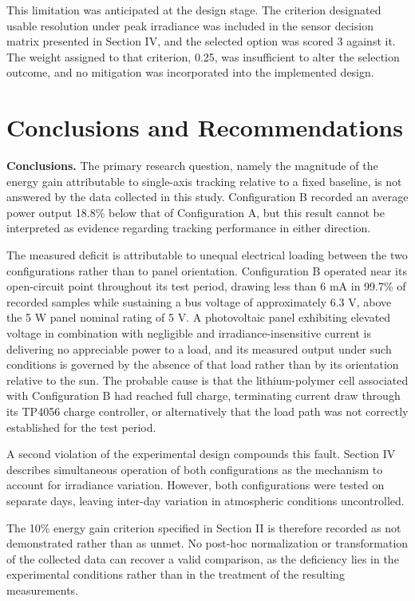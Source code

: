 \documentclass[journal]{IEEEtran}
\begin{document}
This limitation was anticipated at the design stage. The criterion designated usable
resolution under peak irradiance was included in the sensor decision matrix presented
in Section IV, and the selected option was scored 3 against it. The weight assigned to
that criterion, 0.25, was insufficient to alter the selection outcome, and no
mitigation was incorporated into the implemented design.

\section{Conclusions and Recommendations}

\textbf{Conclusions.} The primary research question, namely the magnitude of the
energy gain attributable to single-axis tracking relative to a fixed baseline, is not
answered by the data collected in this study. Configuration B recorded an average
power output 18.8\% below that of Configuration A, but this result cannot be
interpreted as evidence regarding tracking performance in either direction.

The measured deficit is attributable to unequal electrical loading between the two
configurations rather than to panel orientation. Configuration B operated near its
open-circuit point throughout its test period, drawing less than 6 mA in 99.7\% of
recorded samples while sustaining a bus voltage of approximately 6.3 V, above the 5 W
panel nominal rating of 5 V. A photovoltaic panel exhibiting elevated voltage in
combination with negligible and irradiance-insensitive current is delivering no
appreciable power to a load, and its measured output under such conditions is governed
by the absence of that load rather than by its orientation relative to the sun. The
probable cause is that the lithium-polymer cell associated with Configuration B had
reached full charge, terminating current draw through its TP4056 charge controller, or
alternatively that the load path was not correctly established for the test period.

A second violation of the experimental design compounds this fault. Section IV
describes simultaneous operation of both configurations as the mechanism to account for
irradiance variation. However, both configurations were tested on separate days,
leaving inter-day variation in atmospheric conditions uncontrolled.

The 10\% energy gain criterion specified in Section II is therefore recorded as not
demonstrated rather than as unmet. No post-hoc normalization or transformation of the
collected data can recover a valid comparison, as the deficiency lies in the
experimental conditions rather than in the treatment of the resulting measurements.
\end{document}
